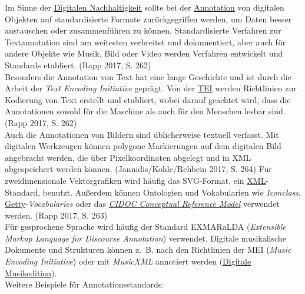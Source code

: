 \documentclass{article}
\begin{document}
    Im Sinne der \href{http://gams.uni-graz.at/o:konde.6}{Digitalen Nachhaltigkeit} sollte bei der \href{http://gams.uni-graz.at/o:konde.17}{Annotation} von digitalen Objekten auf standardisierte Formate zurückgegriffen werden, um Daten besser austauschen oder zusammenführen zu können. Standardisierte Verfahren zur Textannotation sind am weitesten verbreitet und dokumentiert, aber auch für andere Objekte wie Musik, Bild oder Video werden Verfahren entwickelt und Standards etabliert. (Rapp 2017, S. 262)\\
            
        Besonders die Annotation von Text hat eine lange Geschichte und ist durch die Arbeit der \emph{Text Encoding Initiative} geprägt. Von der \href{http://gams.uni-graz.at/o:konde.178}{TEI} werden Richtlinien zur Kodierung von Text erstellt und etabliert, wobei darauf geachtet wird, dass die Annotationen sowohl für die Maschine als auch für den Menschen lesbar sind. (Rapp 2017, S. 262)\\
            
        Auch die Annotationen von Bildern sind üblicherweise textuell verfasst. Mit digitalen Werkzeugen können polygone Markierungen auf dem digitalen Bild angebracht werden, die über Pixelkoordinaten abgelegt und in XML abgespeichert werden können. (Jannidis/Kohle/Rehbein 2017, S. 264) Für zweidimensionale Vektorgrafiken wird häufig das SVG-Format, ein \href{http://gams.uni-graz.at/o:konde.215}{XML}-Standard, benutzt. Außerdem können Ontologien und Vokabularien wie \emph{Iconclass}, \href{http://gams.uni-graz.at/o:konde.108}{Getty}-\emph{Vocabularies} oder das \emph{\href{http://gams.uni-graz.at/o:konde.133}{CIDOC Conceptual Reference Model}} verwendet werden. (Rapp 2017, S. 263)\\
            
        Für gesprochene Sprache wird häufig der Standard EXMARaLDA (\emph{Extensible Markup Language for Discourse Annotation}) verwendet. Digitale musikalische Dokumente und Strukturen können z. B. nach den Richtlinien der MEI (\emph{Music Encoding Initiative}) oder mit \emph{MusicXML} annotiert werden (\href{http://gams.uni-graz.at/o:konde.139}{Digitale Musikedition}).\\
            
        Weitere Beispiele für Annotationsstandards:\\
            
\end{document}
